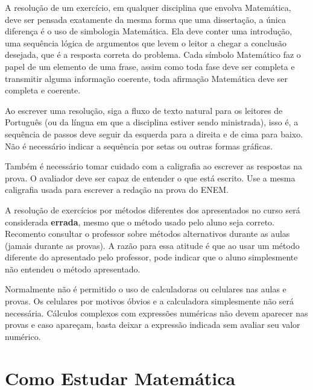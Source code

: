 A resolução de um exercício, em qualquer disciplina que envolva Matemática, deve ser pensada exatamente da mesma forma
que uma dissertação, a única diferença é o uso de simbologia Matemática. Ela deve conter uma introdução,
uma sequência lógica de argumentos que levem o leitor a chegar a conclusão desejada, que é a resposta correta
do problema. Cada símbolo Matemático faz o papel de um elemento de uma frase, assim como toda fase deve
ser completa e transmitir alguma informação coerente, toda afirmação Matemática deve ser completa e coerente.

Ao escrever uma resolução, siga a fluxo de texto natural para os leitores de Português (ou da língua em que a disciplina
estiver sendo ministrada), isso é, a sequência de passos deve seguir da esquerda para a direita e de cima para baixo.
Não é necessário indicar a sequência por setas ou outras formas gráficas.

Também é necessário tomar cuidado com a caligrafia ao escrever as respostas na prova. O avaliador deve ser capaz
de entender o que está escrito. Use a mesma caligrafia usada para escrever a redação na prova do ENEM.

A resolução de exercícios por métodos diferentes dos apresentados no curso será considerada \textbf{errada},
mesmo que o método usado pelo aluno seja correto. Recomento consultar o professor sobre métodos
alternativos durante as aulas (jamais durante as provas). A razão para essa atitude é que
ao usar um método diferente do apresentado pelo professor, pode indicar que o aluno simplesmente
não entendeu o método apresentado.

Normalmente não é permitido o uso de calculadoras ou celulares nas aulas e provas. Os celulares por motivos óbvios
e a calculadora simplesmente não será necessária. Cálculos complexos com expressões numéricas não devem aparecer
nas provas e caso apareçam, basta deixar a expressão indicada sem avaliar seu valor numérico.

\section*{Como Estudar Matemática}

